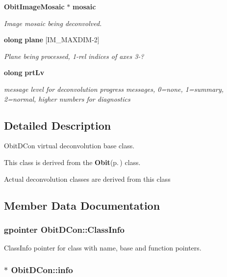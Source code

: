 \begin{CompactItemize}
{\bf Obit\-Image\-Mosaic} $\ast$ {\bf mosaic}
\begin{CompactList}\small\item\em Image mosaic being deconvolved. \item\end{CompactList}\item 
{\bf olong} {\bf plane} [IM\_\-MAXDIM-2]
\begin{CompactList}\small\item\em Plane being processed, 1-rel indices of axes 3-? \item\end{CompactList}\item 
{\bf olong} {\bf prt\-Lv}
\begin{CompactList}\small\item\em message level for deconvolution progress messages, 0=none, 1=summary, 2=normal, higher numbers for diagnostics \item\end{CompactList}\end{CompactItemize}


\subsection{Detailed Description}
Obit\-DCon virtual deconvolution base class. 

This class is derived from the {\bf Obit}{\rm (p.\,\pageref{structObit})} class.

Actual deconvolution classes are derived from this class 



\subsection{Member Data Documentation}
\subsubsection{\setlength{\rightskip}{0pt plus 5cm}gpointer {\bf Obit\-DCon::Class\-Info}}\label{structObitDCon_o1}


Class\-Info pointer for class with name, base and function pointers. 

\subsubsection{$\ast$ {\bf Obit\-DCon::info}}\label{structObitDCon_o5}


